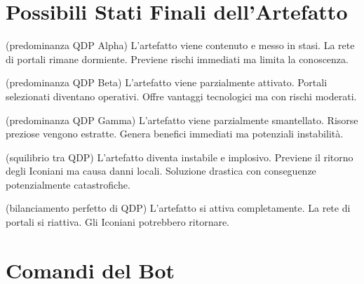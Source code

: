 \documentclass[11pt,a4paper]{article}
\begin{document}
\section{Possibili Stati Finali dell'Artefatto}

\begin{tcolorbox}[colback=masterlightpurple!10, colframe=masterpurple]
\begin{description}[leftmargin=*]
\item[Stabilizzazione] (predominanza QDP Alpha) L'artefatto viene contenuto e messo in stasi. La rete di portali rimane dormiente. Previene rischi immediati ma limita la conoscenza.

\item[Attivazione Controllata] (predominanza QDP Beta) L'artefatto viene parzialmente attivato. Portali selezionati diventano operativi. Offre vantaggi tecnologici ma con rischi moderati.

\item[Estrazione] (predominanza QDP Gamma) L'artefatto viene parzialmente smantellato. Risorse preziose vengono estratte. Genera benefici immediati ma potenziali instabilità.

\item[Distruzione] (squilibrio tra QDP) L'artefatto diventa instabile e implosivo. Previene il ritorno degli Iconiani ma causa danni locali. Soluzione drastica con conseguenze potenzialmente catastrofiche.

\item[Risveglio Completo] (bilanciamento perfetto di QDP) L'artefatto si attiva completamente. La rete di portali si riattiva. Gli Iconiani potrebbero ritornare.
\end{description}
\end{tcolorbox}

\section{Comandi del Bot}
\end{document}
